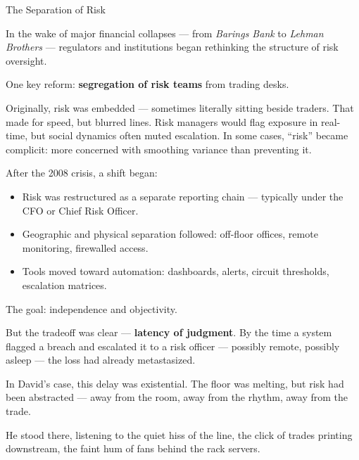 \medskip

\begin{HistoricalSidebar}{The Separation of Risk}

  In the wake of major financial collapses — from \textit{Barings Bank} to \textit{Lehman Brothers} — regulators and 
  institutions began rethinking the structure of risk oversight.
  
  \medskip
  
  One key reform: \textbf{segregation of risk teams} from trading desks.
  
  \medskip
  
  Originally, risk was embedded — sometimes literally sitting beside traders. That made for speed, but blurred lines. 
  Risk managers would flag exposure in real-time, but social dynamics often muted escalation. In some cases, “risk” 
  became complicit: more concerned with smoothing variance than preventing it.
  
  \medskip
  
  After the 2008 crisis, a shift began:

  \medskip

  \begin{itemize}
    \item Risk was restructured as a separate reporting chain — typically under the CFO or Chief Risk Officer.
    \item Geographic and physical separation followed: off-floor offices, remote monitoring, firewalled access.
    \item Tools moved toward automation: dashboards, alerts, circuit thresholds, escalation matrices.
  \end{itemize}
  
  \medskip
  
  The goal: independence and objectivity.

  \medskip
  
  But the tradeoff was clear — \textbf{latency of judgment}. By the time a system flagged a breach and escalated it 
  to a risk officer — possibly remote, possibly asleep — the loss had already metastasized.
  
  \medskip
  
  In David’s case, this delay was existential. The floor was melting, but risk had been abstracted — away from the 
  room, away from the rhythm, away from the trade.
  
\end{HistoricalSidebar}

He stood there, listening to the quiet hiss of the line, the click of trades printing downstream, the faint hum of 
fans behind the rack servers.

